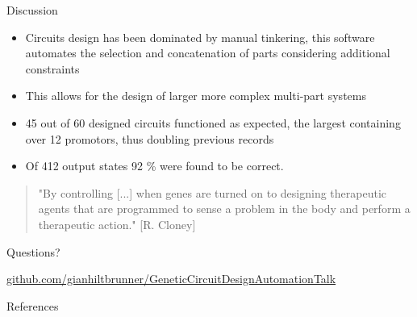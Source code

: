\documentclass[10pt]{beamer}
\begin{document}
\begin{frame}{Discussion}
  \begin{itemize}
    \item Circuits design has been dominated by manual tinkering, this software automates the selection and concatenation of parts considering additional constraints
    \item This allows for the design of larger more complex multi-part systems
    \item 45 out of 60 designed circuits functioned as expected, the largest containing over 12 promotors, thus doubling previous records 
    \item Of 412 output states 92 \% were found to be correct.
  \end{itemize}
  \begin{itemize}[<+- | alert@+>]
    \begin{quote}
        \vspace{0.2cm}
        
        "By controlling [...] when genes are turned on to designing therapeutic agents that are programmed to sense a problem in the body and perform a therapeutic action." [R. Cloney]
    \end{quote}
    \end{itemize}
  \nocite{Cloney2016SyntheticDesign}
\end{frame}


{
    \begin{frame}[standout]
        \vspace{3cm}
        Questions?
        \vspace{3cm}
        {
            \footnotesize
            \begin{center}{\LARGE {}} \url{github.com/gianhiltbrunner/GeneticCircuitDesignAutomationTalk}\end{center}

        } 
    \end{frame}
}

\appendix

\begin{frame}[allowframebreaks]{References}

  
  

\end{frame}

\begin{frame}{}
    
\end{frame}
\end{document}
